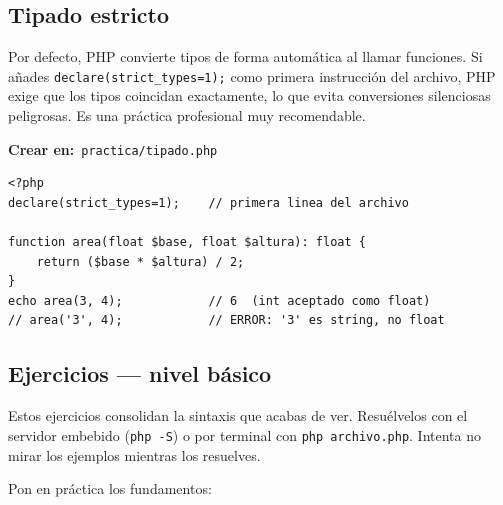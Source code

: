 \documentclass[11pt]{article}
\begin{document}
\subsection{Tipado estricto}
Por defecto, PHP convierte tipos de forma automática al llamar funciones. Si añades \texttt{declare(strict\_types=\allowbreak{}1);\allowbreak{}} como primera instrucción del archivo, PHP exige que los tipos coincidan exactamente, lo que evita conversiones silenciosas peligrosas. Es una práctica profesional muy recomendable.

{\small\color{phpazulo}\textbf{Crear en:}~}\texttt{practica/\allowbreak{}tipado.\allowbreak{}php}\par\nobreak\vspace{-1pt}
\begin{cajacodigo}
\begin{lstlisting}[style=php]
<?php
declare(strict_types=1);    // primera linea del archivo

function area(float $base, float $altura): float {
    return ($base * $altura) / 2;
}
echo area(3, 4);            // 6  (int aceptado como float)
// area('3', 4);            // ERROR: '3' es string, no float
\end{lstlisting}
\end{cajacodigo}
\vspace{2pt}
\subsection{Ejercicios — nivel básico}
Estos ejercicios consolidan la sintaxis que acabas de ver. Resuélvelos con el servidor embebido (\texttt{php -S}) o por terminal con \texttt{php archivo.\allowbreak{}php}. Intenta no mirar los ejemplos mientras los resuelves.

Pon en práctica los fundamentos:
\end{document}
